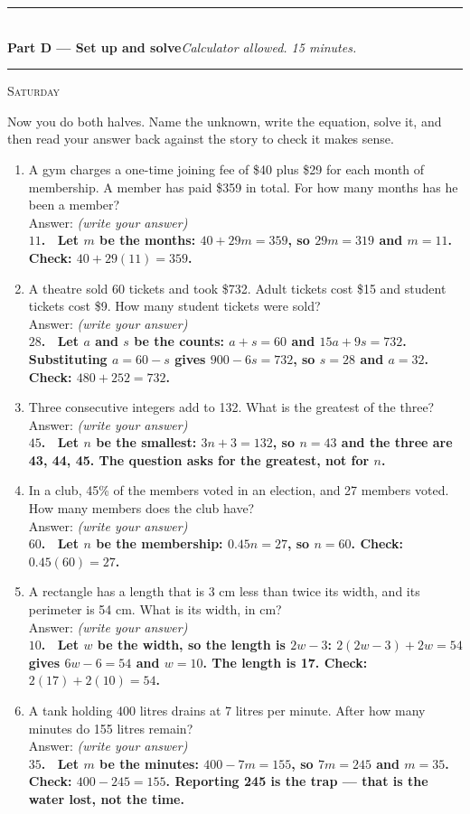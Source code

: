 \documentclass[11pt,a4paper]{article}
\newif\ifANSWERS
\newcommand{\PartHead}[2]{%
  \vspace{6pt}
  {\color{navy}\rule{\textwidth}{0.8pt}}\\[2pt]
  {\large\bfseries\color{navy}#1}\hfill{\small\itshape #2}\\[-4pt]
  {\color{navy}\rule{\textwidth}{0.4pt}}
  \vspace{4pt}
}
\newcommand{\sitting}[1]{{\footnotesize\textsc{\color{navy}#1}}\par\vspace{2pt}}
\newcommand{\spr}{\\[3pt]\hspace*{6pt}Answer: \underline{\hspace{3.2cm}}\hfill{\footnotesize\itshape(write your answer)}}
\newcommand{\ans}[1]{\ {\color{keyred}\bfseries #1}}
\newcommand{\ans}[1]{}
\begin{document}
\ifANSWERS\else\newpage\fi
\PartHead{Part D --- Set up and solve}{Calculator allowed. 15 minutes.}
\sitting{Saturday}
Now you do both halves. Name the unknown, write the equation, solve it, and then read
your answer back against the story to check it makes sense.

\begin{enumerate}[leftmargin=20pt,itemsep=10pt]
\item A gym charges a one-time joining fee of \$40 plus \$29 for each month of
  membership. A member has paid \$359 in total. For how many months has he been a
  member? \spr
  \ans{\\ $11$. \ Let $m$ be the months: $40+29m=359$, so $29m=319$ and $m=11$.
  Check: $40+29(11)=359$.}

\item A theatre sold 60 tickets and took \$732. Adult tickets cost \$15 and student
  tickets cost \$9. How many student tickets were sold? \spr
  \ans{\\ $28$. \ Let $a$ and $s$ be the counts: $a+s=60$ and $15a+9s=732$. Substituting
  $a=60-s$ gives $900-6s=732$, so $s=28$ and $a=32$. Check: $480+252=732$.}

\item Three consecutive integers add to 132. What is the greatest of the three? \spr
  \ans{\\ $45$. \ Let $n$ be the smallest: $3n+3=132$, so $n=43$ and the three are
  43, 44, 45. The question asks for the greatest, not for $n$.}

\item In a club, 45\% of the members voted in an election, and 27 members voted. How
  many members does the club have? \spr
  \ans{\\ $60$. \ Let $n$ be the membership: $0.45n=27$, so $n=60$. Check:
  $0.45(60)=27$.}

\item A rectangle has a length that is 3 cm less than twice its width, and its
  perimeter is 54 cm. What is its width, in cm? \spr
  \ans{\\ $10$. \ Let $w$ be the width, so the length is $2w-3$: $2(2w-3)+2w=54$ gives
  $6w-6=54$ and $w=10$. The length is 17. Check: $2(17)+2(10)=54$.}

\item A tank holding 400 litres drains at 7 litres per minute. After how many minutes
  do 155 litres remain? \spr
  \ans{\\ $35$. \ Let $m$ be the minutes: $400-7m=155$, so $7m=245$ and $m=35$.
  Check: $400-245=155$. Reporting 245 is the trap --- that is the water lost, not the
  time.}
\end{enumerate}
\end{document}
